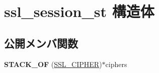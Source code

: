 \hypertarget{structssl__session__st}{}\section{ssl\+\_\+session\+\_\+st 構造体}
\label{structssl__session__st}
\subsection*{公開メンバ関数}
\begin{DoxyCompactItemize}
\item 
\hypertarget{structssl__session__st_a2f3bc734f54c269abc797fa55b4085a2}{}{\bfseries S\+T\+A\+C\+K\+\_\+\+O\+F} (\hyperlink{structssl__cipher__st}{S\+S\+L\+\_\+\+C\+I\+P\+H\+E\+R})$\ast$ciphers\label{structssl__session__st_a2f3bc734f54c269abc797fa55b4085a2}

\end{DoxyCompactItemize}

